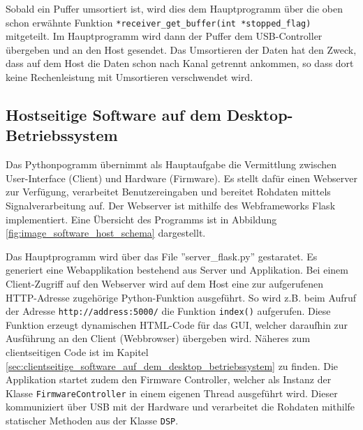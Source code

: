 Sobald ein Puffer umsortiert ist, wird dies dem Hauptprogramm über die oben schon erwähnte Funktion \texttt{*receiver\_get\_buffer(int *stopped\_flag)} mitgeteilt. Im Hauptprogramm wird dann der Puffer dem USB-Controller übergeben und an den Host gesendet. Das Umsortieren der Daten hat den Zweck, dass auf dem Host die Daten schon nach Kanal getrennt ankommen, so dass dort keine Rechenleistung mit Umsortieren verschwendet wird.


\clearpage
\subsection{Hostseitige Software auf dem Desktop-Betriebssystem}\label{sec:hostseitige_software_auf_dem_desktop-betriebssystem}
Das Pythonpogramm übernimmt als Hauptaufgabe die Vermittlung zwischen User-Interface (Client) und Hardware (Firmware). Es stellt dafür einen Webserver zur Verfügung, verarbeitet Benutzereingaben und bereitet Rohdaten mittels Signalverarbeitung auf. Der Webserver ist mithilfe des Webframeworks Flask implementiert. Eine Übersicht des Programms ist in Abbildung \ref{fig:image_software_host_schema} dargestellt.

Das Hauptprogramm wird über das File ''server\_flask.py'' gestaratet. Es generiert eine Web\-appli\-kation bestehend aus Server und Applikation. Bei einem Client-Zugriff auf den Webserver wird auf dem Host eine zur aufgerufenen HTTP-Adresse zugehörige Python-Funktion ausgeführt. So wird z.B. beim Aufruf der Adresse \texttt{http://address:5000/} die Funktion \texttt{index()} aufgerufen. Diese Funktion erzeugt dynamischen HTML-Code für das GUI, welcher daraufhin zur Ausführung an den Client (Webbrowser) übergeben wird. Näheres zum clientseitigen Code ist im Kapitel \ref{sec:clientseitige_software_auf_dem_desktop_betriebssystem} zu finden.
Die Applikation startet zudem den Firmware Controller, welcher als Instanz der Klasse \texttt{FirmwareController} in einem eigenen Thread ausgeführt wird. Dieser kommuniziert über USB mit der Hardware und verarbeitet die Rohdaten mithilfe statischer Methoden aus der Klasse \texttt{DSP}.

